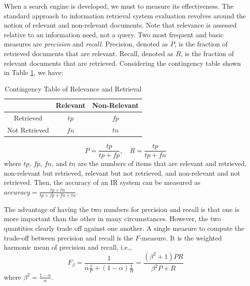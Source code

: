 When a search engine is developed, we must to measure its effectiveness.
The standard approach to information retrieval system evaluation revolves around the notion of relevant and non-relevant documents.
Note that relevance is assessed relative to an information need, not a query.
Two most frequent and basic measures are \emph{precision} and \emph{recall}.
Precision, denoted as $P$, is the fraction of retrieved documents that are relevant.
Recall, denoted as $R$, is the fraction of relevant documents that are retrieved.
Considering the contingency table shown in Table \ref{tbl:contingency}, we have:
\begin{table}
\centering
\caption{\small{Contingency Table of Relevance and Retrieval}}\label{tbl:contingency}
  \begin{tabular}{|c|c|c|}
             \hline
             & Relevant & Non-Relevant  \\
             \hline
             Retrieved & $tp$ & $fp$ \\
             \hline
             Not Retrieved & $fn$ & $tn$ \\
             \hline
  \end{tabular}
\end{table}
\begin{equation}\label{eq:p_r}
  P = \frac{tp}{tp+fp},\quad  R = \frac{tp}{tp+fn}
\end{equation}
where $tp$, $fp$, $fn$, and $tn$ are the numbers of items that are relevant and retrieved, non-relevant but retrieved, relevant but not retrieved, and non-relevant and not retrieved.
Then, the accuracy of an IR system can be measured as $accuracy=\frac{tp+tn}{tp+fp+fn+tn}$.

The advantage of having the two numbers for precision and recall is that one is more important than the other in many circumstances.
However, the two quantities clearly trade off against one another.
A single measure to compute the trade-off between precision and recall is the $F$-measure. It is the weighted harmonic mean of precision and recall, i.e.,
\begin{equation}\label{eq:F}
  F_{\beta}=\frac{1}{\alpha \frac{1}{P}+(1-\alpha)\frac{1}{R}}=\frac{(\beta^2+1)PR}{\beta^2P+R}
\end{equation}
where $\beta^2=\frac{1-\alpha}{\alpha}$.
